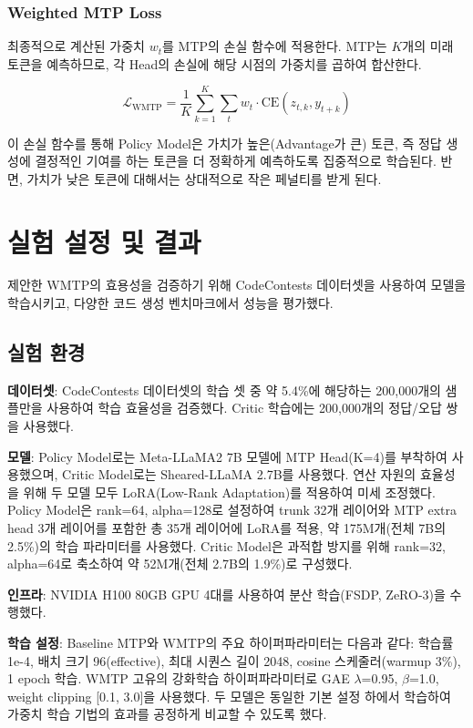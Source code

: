 \documentclass[11pt,a4paper]{article}
\begin{document}
\subsubsection{Weighted MTP Loss}
최종적으로 계산된 가중치 $w_t$를 MTP의 손실 함수에 적용한다. MTP는 $K$개의 미래 토큰을 예측하므로, 각 Head의 손실에 해당 시점의 가중치를 곱하여 합산한다.

\begin{equation}
\mathcal{L}_{\text{WMTP}} = \frac{1}{K} \sum_{k=1}^{K} \sum_{t} w_t \cdot \text{CE}(z_{t,k}, y_{t+k})
\end{equation}

이 손실 함수를 통해 Policy Model은 가치가 높은(Advantage가 큰) 토큰, 즉 정답 생성에 결정적인 기여를 하는 토큰을 더 정확하게 예측하도록 집중적으로 학습된다. 반면, 가치가 낮은 토큰에 대해서는 상대적으로 작은 페널티를 받게 된다.

\section{실험 설정 및 결과}

제안한 WMTP의 효용성을 검증하기 위해 CodeContests 데이터셋을 사용하여 모델을 학습시키고, 다양한 코드 생성 벤치마크에서 성능을 평가했다.

\subsection{실험 환경}

\textbf{데이터셋}: CodeContests 데이터셋의 학습 셋 중 약 5.4\%에 해당하는 200,000개의 샘플만을 사용하여 학습 효율성을 검증했다. Critic 학습에는 200,000개의 정답/오답 쌍을 사용했다.

\textbf{모델}: Policy Model로는 Meta-LLaMA2 7B 모델에 MTP Head(K=4)를 부착하여 사용했으며, Critic Model로는 Sheared-LLaMA 2.7B를 사용했다. 연산 자원의 효율성을 위해 두 모델 모두 LoRA(Low-Rank Adaptation)를 적용하여 미세 조정했다. Policy Model은 rank=64, alpha=128로 설정하여 trunk 32개 레이어와 MTP extra head 3개 레이어를 포함한 총 35개 레이어에 LoRA를 적용, 약 175M개(전체 7B의 2.5\%)의 학습 파라미터를 사용했다. Critic Model은 과적합 방지를 위해 rank=32, alpha=64로 축소하여 약 52M개(전체 2.7B의 1.9\%)로 구성했다.

\textbf{인프라}: NVIDIA H100 80GB GPU 4대를 사용하여 분산 학습(FSDP, ZeRO-3)을 수행했다.

\textbf{학습 설정}: Baseline MTP와 WMTP의 주요 하이퍼파라미터는 다음과 같다: 학습률 1e-4, 배치 크기 96(effective), 최대 시퀀스 길이 2048, cosine 스케줄러(warmup 3\%), 1 epoch 학습. WMTP 고유의 강화학습 하이퍼파라미터로 GAE $\lambda$=0.95, $\beta$=1.0, weight clipping [0.1, 3.0]을 사용했다. 두 모델은 동일한 기본 설정 하에서 학습하여 가중치 학습 기법의 효과를 공정하게 비교할 수 있도록 했다.
\end{document}
